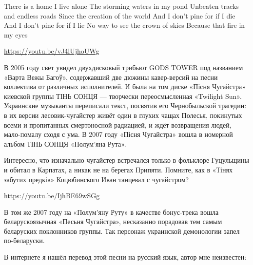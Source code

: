 There is a home I live alone
The storming waters in my pond
Unbeaten tracks and endless roads
Since the creation of the world
And I don't pine for if I die
And I don't pine for if I lie
No way to see the crown of skies
Because that fire in my eyes

\url{https://youtu.be/vJ4lUjhoUWg}

В 2005 году свет увидел двухдисковый трибьют GODS TOWER под названием «Варта
Вежы Багоў», содержавший две дюжины кавер-версий на песни коллектива от
различных исполнителей. И была на том диске «Пісня Чугайстра» киевской группы
ТІНЬ СОНЦЯ — творчески переосмысленная «Twilight Sun». Украинские музыканты
переписали текст, посвятив его Чернобыльской трагедии: в их версии
лесовик-чугайстер живёт один в глухих чащах Полесья, покинутых всеми и
пропитанных смертоносной радиацией, и ждёт возвращения людей, мало-помалу сходя
с ума. В 2007 году «Пісня Чугайстра» вошла в номерной альбом ТІНЬ СОНЦЯ
«Полум’яна Рута».

Интересно, что изначально чугайстер встречался только в фольклоре Гуцульщины и
обитал в Карпатах, а никак не на берегах Припяти. Помните, как в «Тінях забутих
предків» Коцюбинского Иван танцевал с чугайстром?

\url{https://youtu.be/IjhBE69wSGg}

В том же 2007 году на «Полум’яну Руту» в качестве бонус-трека вошла
беларускоязычная «Песьня Чугайстра», несказанно порадовав тем самым беларуских
поклонников группы. Так персонаж украинской демонологии запел по-беларуски.

В интернете я нашёл перевод этой песни на русский язык, автор мне неизвестен:
